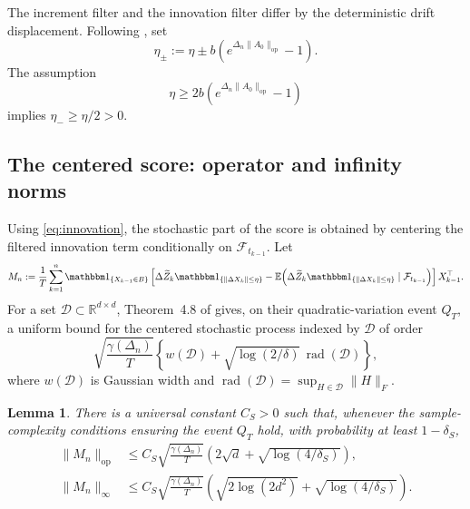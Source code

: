 \documentclass[12pt]{article}
\newtheorem{lemma}{Lemma}
\theoremstyle{definition}
\DeclareMathOperator{\rad}{rad}
\begin{document}
	The increment filter and the innovation filter differ by the deterministic drift displacement. Following \citet[Lemma~A.2]{DexheimerJeszka2026}, set
	\begin{equation}
		\eta_\pm
		:=\eta\pm b\left(e^{\Delta_n\|A_0\|_{\mathrm{op}}}-1\right).
		\label{eq:etapm}
	\end{equation}
	The assumption
	\begin{equation}
		\eta\ge2b\left(e^{\Delta_n\|A_0\|_{\mathrm{op}}}-1\right)
		\label{eq:eta_condition}
	\end{equation}
	implies $\eta_-\ge\eta/2>0$.
	
	\subsection{The centered score: operator and infinity norms}
	
	Using \eqref{eq:innovation}, the stochastic part of the score is obtained by centering the filtered innovation term conditionally on $\mathcal F_{t_{k-1}}$. Let
	\begin{equation}
		M_n
		:=\frac1T\sum_{k=1}^n
		\mathbbm1_{\{X_{k-1}\in B\}}
		\left[
		\Delta\widetilde Z_k\mathbbm1_{\{\|\Delta X_k\|\le\eta\}}
		-\mathbb E\!\left(\Delta\widetilde Z_k\mathbbm1_{\{\|\Delta X_k\|\le\eta\}}\mid\mathcal F_{t_{k-1}}\right)
		\right]X_{k-1}^\top.
		\label{eq:Mn}
	\end{equation}
	For a set $\mathcal D\subset\mathbb R^{d\times d}$, Theorem~4.8 of \citet{DexheimerJeszka2026} gives, on their quadratic-variation event $Q_T$, a uniform bound for the centered stochastic process indexed by $\mathcal D$ of order
	\begin{equation}
		\sqrt{\frac{\gamma(\Delta_n)}{T}}
		\left\{w(\mathcal D)+\sqrt{\log(2/\delta)}\,\rad(\mathcal D)\right\},
		\label{eq:DJ_width}
	\end{equation}
	where $w(\mathcal D)$ is Gaussian width and $\rad(\mathcal D)=\sup_{H\in\mathcal D}\|H\|_F$.
	
	\begin{lemma}\label{lem:dual}
		There is a universal constant $C_S>0$ such that, whenever the sample-complexity conditions ensuring the event $Q_T$ hold, with probability at least $1-\delta_S$,
		\begin{align}
			\|M_n\|_{\mathrm{op}}
			&\le C_S\sqrt{\frac{\gamma(\Delta_n)}T}
			\left(2\sqrt d+\sqrt{\log(4/\delta_S)}\right),
			\label{eq:opscore}\\
			\|M_n\|_\infty
			&\le C_S\sqrt{\frac{\gamma(\Delta_n)}T}
			\left(\sqrt{2\log(2d^2)}+\sqrt{\log(4/\delta_S)}\right).
			\label{eq:infscore}
		\end{align}
	\end{lemma}
	
\end{document}
